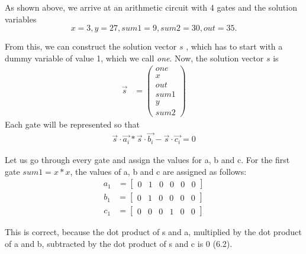 As shown above, we arrive at an arithmetic circuit with 4 gates and the solution variables
\[x = 3, y = 27, sum1 = 9, sum2 = 30, out = 35.\]

From this, we can construct the solution vector \(s\) , which has to start with a dummy variable of value 1, which we call \textit{one}.
Now, the solution vector \(s\) is
\begin{align}
    \Vec{s} &= \begin{pmatrix}
     one \\ x \\ out \\ sum1 \\ y \\ sum2
\end{pmatrix}
\end{align}
Each gate will be represented so that
\begin{align}
     \Vec{s}\cdot\Vec{a_i} * \Vec{s}\cdot\Vec{b_i} - \Vec{s}\cdot\Vec{c_i} = 0
\end{align}

Let us go through every gate and assign the values for a, b and c.
For the first gate \(sum1 = x*x\), the values of a, b and c are assigned as follows:
\begin{align*}
    a_1 &=\begin{bmatrix}
        0 & 1 & 0 & 0 & 0 & 0
    \end{bmatrix}
\end{align*}
\begin{align*}
    b_1&=\begin{bmatrix}
        0 & 1 & 0 & 0 & 0 & 0 
    \end{bmatrix}
\end{align*}
\begin{align*}
    c_1&=\begin{bmatrix}
        0 & 0 & 0 & 1 & 0 & 0
    \end{bmatrix}
\end{align*}

This is correct, because the dot product of s and a, multiplied by the dot product of a and b, subtracted by the dot product of s and c is 0 (6.2).

